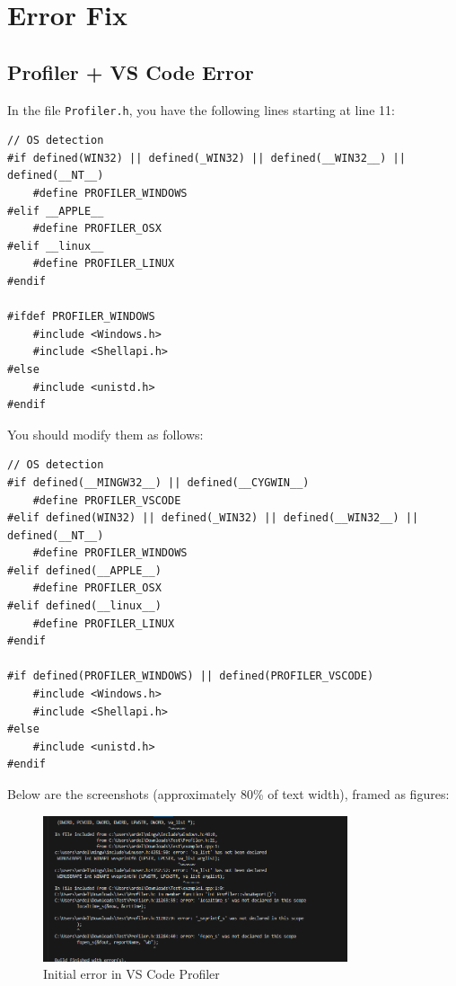 \documentclass[../ro-fa-lab.tex]{subfiles}
\begin{document}
\section{\textbf{Error Fix}}\label{errors}

\subsection{Profiler + VS Code Error}\label{profiler-vscode-error}

In the file \texttt{Profiler.h}, you have the following lines starting at line 11:

\begin{lstlisting}
// OS detection
#if defined(WIN32) || defined(_WIN32) || defined(__WIN32__) || defined(__NT__)
    #define PROFILER_WINDOWS
#elif __APPLE__
    #define PROFILER_OSX
#elif __linux__
    #define PROFILER_LINUX
#endif

#ifdef PROFILER_WINDOWS
    #include <Windows.h>
    #include <Shellapi.h>
#else
    #include <unistd.h>
#endif
\end{lstlisting}

You should modify them as follows:

\begin{lstlisting}
// OS detection
#if defined(__MINGW32__) || defined(__CYGWIN__)
    #define PROFILER_VSCODE
#elif defined(WIN32) || defined(_WIN32) || defined(__WIN32__) || defined(__NT__)
    #define PROFILER_WINDOWS
#elif defined(__APPLE__)
    #define PROFILER_OSX
#elif defined(__linux__)
    #define PROFILER_LINUX
#endif

#if defined(PROFILER_WINDOWS) || defined(PROFILER_VSCODE)
    #include <Windows.h>
    #include <Shellapi.h>
#else
    #include <unistd.h>
#endif
\end{lstlisting}

Below are the screenshots (approximately 80\% of text width), framed as figures:

\begin{figure}[htbp]
    \centering
    \includegraphics[width=0.8\textwidth]{./Resources/error_fix/image1.png}
    \caption{Initial error in VS Code Profiler}
    \label{fig:error1}
\end{figure}
\end{document}
